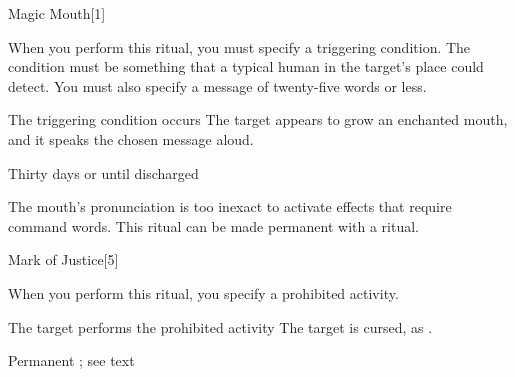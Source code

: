 \begin{spellsection}{Magic Mouth}[1]
    \begin{spellheader}
    \end{spellheader}
    \begin{spellcontent}
        \begin{spelltargetinginfo}
            \spellrng{\rngclose}
        \end{spelltargetinginfo}
        \begin{spelleffects}

            \spellspecial When you perform this ritual, you must specify a triggering condition. The condition must be something that a typical human in the target's place could detect. You must also specify a message of twenty-five words or less.
            \begin{spelltrigger}{The triggering condition occurs}
                \spelleffect The target appears to grow an enchanted mouth, and it speaks the chosen message aloud.
            \end{spelltrigger}
            \spelldur Thirty days or until discharged \dismissable
        \end{spelleffects}
    \end{spellcontent}
    \begin{spellfooter}
        \spellnotes The mouth's pronunciation is too inexact to activate effects that require command words. This ritual can be made permanent with a  ritual.
    \end{spellfooter}
\end{spellsection}

\begin{spellsection}{Mark of Justice}[5]
    \begin{spellheader}
    \end{spellheader}
    \begin{spellcontent}
        \begin{spelltargetinginfo}
        \end{spelltargetinginfo}
        \begin{spelleffects}

            \spellspecial When you perform this ritual, you specify a prohibited activity.
            \begin{spelltrigger}{The target performs the prohibited activity}
                \spelleffect The target is cursed, as .
            \end{spelltrigger}
            \spelldur Permanent \dismissable; see text
        \end{spelleffects}
    \end{spellcontent}
    \begin{spellfooter}
        \spellnotes \cursespellnotes
    \end{spellfooter}
\end{spellsection}


